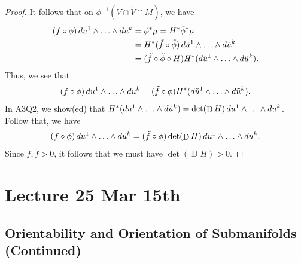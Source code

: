 \documentclass[notoc,notitlepage]{tufte-book}
\DeclareMathOperator{\D}{D}
\begin{document}
\begin{proof}
  It follows that on $\phi^{-1}(V \cap \tilde{V} \cap M)$, we have
  \begin{align*}
    (f \circ \phi)\mathop{}\!d{u^1} \land \hdots \land \mathop{}\!d{u^k}
    &= \phi^* \mu = H^* \tilde{\phi}^* \mu \\
    &= H^*(\tilde{f} \circ \tilde{\phi})\mathop{}\!d{\tilde{u}^1} \land \hdots \land
    \mathop{}\!d{\tilde{u}^k} \\
    &= (\tilde{f} \circ \tilde{\phi} \circ H) H^* (\mathop{}\!d{\tilde{u}^1} \land
    \hdots \land \mathop{}\!d{\tilde{u}^k}).
  \end{align*}
  Thus, we see that
  \begin{equation*}
    (f \circ \phi)\mathop{}\!d{u^1} \land \hdots \land \mathop{}\!d{u^k} = (\tilde{f} \circ
    \phi)H^*(\mathop{}\!d{\tilde{u}^1} \land \hdots \land \mathop{}\!d{\tilde{u}^k}).
  \end{equation*}
  In A3Q2, we show(ed) that $H^*(\dif{\tilde{u}^1} \land \hdots \land
  \dif{\tilde{u}^k}) = \det (\D H) \dif{u^1} \land \hdots \land \dif{u^k}$.
  Follow that, we have
  \begin{equation*}
    (f \circ \phi) \dif{u^1} \land \hdots \land \dif{u^k} = (\tilde{f} \circ
    \phi) \det(\D H) \dif{u^1} \land \hdots \land \dif{u^k}.
  \end{equation*}
  Since $f, \tilde{f} > 0$, it follows that we must have $\det(\D H) > 0$.
\end{proof}



\chapter{Lecture 25 Mar 15th}%
\label{chp:lecture_25_mar_15th}

\section{Orientability and Orientation of Submanifolds (Continued)}%
\label{sec:orientability_and_orientation_of_submanifolds_continued}
\end{document}
